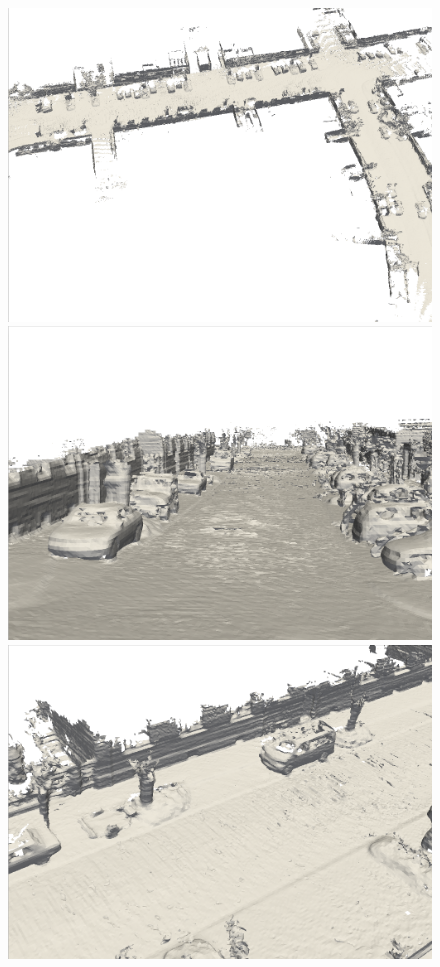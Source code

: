 \begin{figure}[htbp]
\begin{minipage}{0.322\linewidth}
		\includegraphics[width=1\linewidth]{figures/kitti_1_vdb.png}
	\end{minipage}\hfill
	\begin{minipage}{0.322\linewidth}
		\centering
		\includegraphics[width=1\linewidth]{figures/kitti_2_vdb.png}
	\end{minipage}\hfill
    \begin{minipage}{0.322\linewidth}
		\centering
		\includegraphics[width=1\linewidth]{figures/kitti_3_vdb.png}

\end{minipage}
\end{figure}
